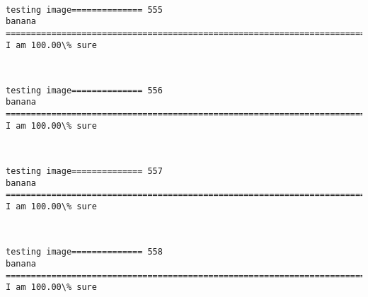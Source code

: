 \documentclass[11pt]{article}
\begin{document}
    \begin{center}
    \end{center}
    { \hspace*{\fill} \\}
    
    \begin{Verbatim}[commandchars=\\\{\}]
testing image============== 555
banana
============================================================================
I am 100.00\% sure

    \end{Verbatim}

    \begin{center}
    \end{center}
    { \hspace*{\fill} \\}
    
    \begin{Verbatim}[commandchars=\\\{\}]
testing image============== 556
banana
============================================================================
I am 100.00\% sure

    \end{Verbatim}

    \begin{center}
    \end{center}
    { \hspace*{\fill} \\}
    
    \begin{Verbatim}[commandchars=\\\{\}]
testing image============== 557
banana
============================================================================
I am 100.00\% sure

    \end{Verbatim}

    \begin{center}
    \end{center}
    { \hspace*{\fill} \\}
    
    \begin{Verbatim}[commandchars=\\\{\}]
testing image============== 558
banana
============================================================================
I am 100.00\% sure

    \end{Verbatim}
\end{document}
